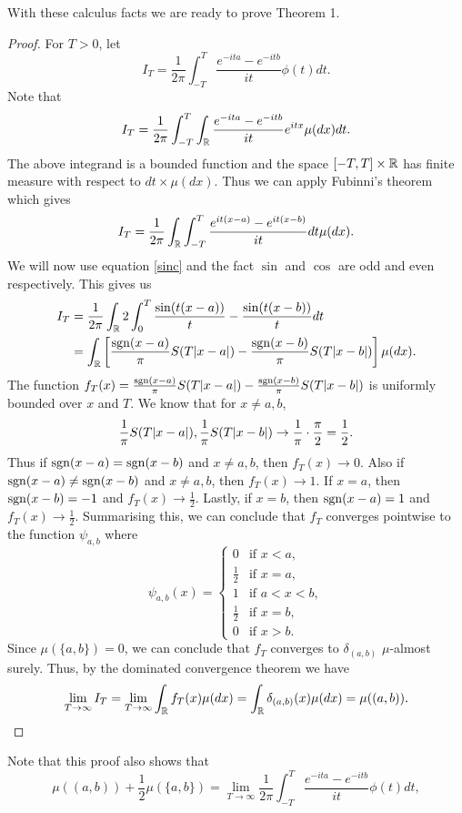 With these calculus facts we are ready to prove Theorem 1.
\begin{proof}
    For $T>0$, let
    \[I_T =\frac{1}{2\pi}\int_{-T}^T \frac{e^{-ita}-e^{-itb}}{it}\phi(t)dt. \]
    Note that 
    \[I_T =\frac{1}{2\pi}\int_{-T}^T \int_{\mathbb R} \frac{e^{-ita}-e^{-itb}}{it}e^{itx} \mu(dx)dt. \]
    The above integrand is a bounded function and the space $[-T,T]\times {\mathbb R}$ has finite measure with respect to $dt\times \mu(dx)$. Thus we can apply Fubinni's theorem which gives
    \[I_T = \frac{1}{2\pi} \int_{\mathbb R} \int_{-T}^T \frac{e^{it(x-a)}-e^{it(x-b)}}{it}dt\mu(dx). \]
    We will now use equation \eqref{sinc} and the fact $\sin$ and $\cos$ are odd and even respectively. This gives us 
    \begin{align*}
        I_T& = \frac{1}{2\pi} \int_{\mathbb R} 2\int_0^T \frac{\sin(t(x-a))}{t}-\frac{\sin(t(x-b))}{t}dt \\
        &= \int_{\mathbb R} \left[\frac{\operatorname*{sgn}(x-a)}{\pi}S(T{\left\lvert x-a\right\rvert})-\frac{\operatorname*{sgn}(x-b)}{\pi}S(T{\left\lvert x-b\right\rvert})\right]\mu(dx).
    \end{align*}
    The function $f_T(x)=\frac{\operatorname*{sgn}(x-a)}{\pi}S(T{\left\lvert x-a\right\rvert})-\frac{\operatorname*{sgn}(x-b)}{\pi}S(T{\left\lvert x-b\right\rvert})$ is uniformly bounded over $x$ and $T$. We know that for $x \neq a,b$, \[\frac{1}{\pi}S(T{\left\lvert x-a\right\rvert}), \frac{1}{\pi}S(T{\left\lvert x-b\right\rvert}) \to \frac{1}{\pi}\cdot \frac{\pi}{2}=\frac{1}{2}.\]
    Thus if $\operatorname*{sgn}(x-a)=\operatorname*{sgn}(x-b)$ and $x\neq a,b$, then $f_T(x) \to 0$. Also if $\operatorname*{sgn}(x-a)\neq \operatorname*{sgn}(x-b)$ and $x \neq a,b$, then $f_T(x) \to 1$. If $x=a$, then $\operatorname*{sgn}(x-b)=-1$ and $f_T(x) \to \frac{1}{2}$. Lastly, if $x = b$, then $\operatorname*{sgn}(x-a)=1$ and $f_T(x) \to \frac{1}{2}$. Summarising this, we can conclude that $f_T$ converges pointwise to the function $\psi_{a,b}$ where 
    \[\psi_{a,b}(x) = \begin{cases}
        0 & \text{if } x < a,\\
        \frac{1}{2} & \text{if } x = a,\\
        1 & \text{if } a<x<b,\\
        \frac{1}{2} & \text{if } x = b,\\
        0 & \text{if } x > b.
    \end{cases} \]
    Since $\mu(\{a,b\})=0$, we can conclude that $f_T$ converges to $\delta_{(a,b)}$ $\mu$-almost surely. Thus, by the dominated convergence theorem we have
    \[\lim_{T\to \infty} I_T = \lim_{T \to \infty} \int_{\mathbb R} f_T(x)\mu(dx)=\int_{\mathbb R} \delta_{(a,b)}(x)\mu(dx)=\mu((a,b)). \qedhere  \]
\end{proof}
Note that this proof also shows that 
\[\mu((a,b))+\frac{1}{2}\mu(\{a,b\}) = \lim_{T \to \infty} \frac{1}{2\pi}\int_{-T}^T \frac{e^{-ita}-e^{-itb}}{it}\phi(t)dt, \]
